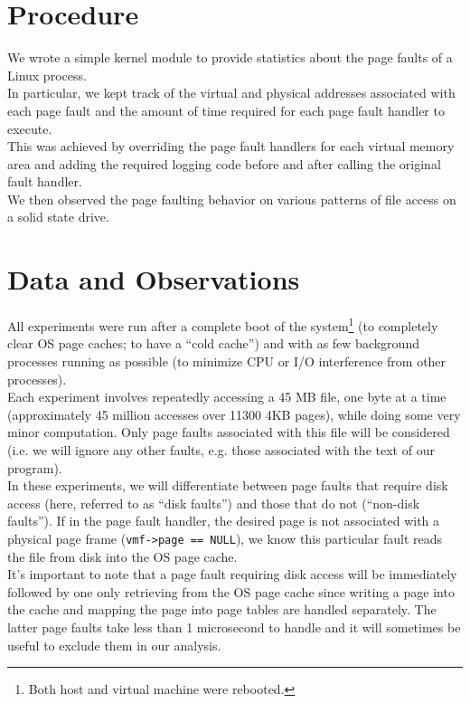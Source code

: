 \documentclass{article}
\begin{document}
\vspace*{-40pt}
\section{Procedure}
	We wrote a simple kernel module to provide statistics about the page faults of a Linux process.\\
	
	In particular, we kept track of the virtual and physical addresses associated with each page fault and the amount of time required for each page fault handler to execute.\\
	
	This was achieved by overriding the page fault handlers for each virtual memory area and adding the required logging code before and after calling the original fault handler.\\
	
	We then observed the page faulting behavior on various patterns of file access on a solid state drive.
\section{Data and Observations}
	All experiments were run after a complete boot of the system\footnote{Both host and virtual machine were rebooted.} (to completely clear OS page caches; to have a ``cold cache'') and with as few background processes running as possible (to minimize CPU or I/O interference from other processes).\\
	
	Each experiment involves repeatedly accessing a 45 MB file, one byte at a time (approximately 45 million accesses over 11300 4KB pages), while doing some very minor computation. Only page faults associated with this file will be considered (i.e. we will ignore any other faults, e.g. those associated with the text of our program).\\
	
	In these experiments, we will differentiate between page faults that require disk access (here, referred to as ``disk faults'') and those that do not (``non-disk faults''). If in the page fault handler, the desired page is not associated with a physical page frame (\texttt{vmf->page == NULL}), we know this particular fault reads the file from disk into the OS page cache.\\
	
	It's important to note that a page fault requiring disk access will be immediately followed by one only retrieving from the OS page cache since writing a page into the cache and mapping the page into page tables are handled separately. The latter page faults take less than 1 microsecond to handle and it will sometimes be useful to exclude them in our analysis.\\
	
\end{document}
